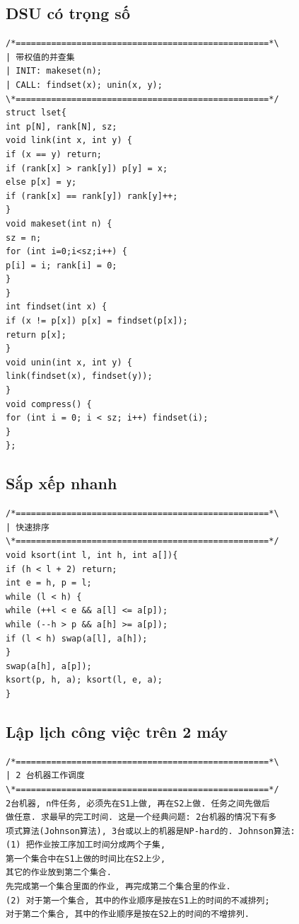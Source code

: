 \documentclass[11pt]{article}
\begin{document}
\subsection{DSU có trọng số}

\begingroup
\scriptsize
\begin{verbatim}
/*==================================================*\
| 带权值的并查集
| INIT: makeset(n);
| CALL: findset(x); unin(x, y);
\*==================================================*/
struct lset{
int p[N], rank[N], sz;
void link(int x, int y) {
if (x == y) return;
if (rank[x] > rank[y]) p[y] = x;
else p[x] = y;
if (rank[x] == rank[y]) rank[y]++;
}
void makeset(int n) {
sz = n;
for (int i=0;i<sz;i++) {
p[i] = i; rank[i] = 0;
}
}
int findset(int x) {
if (x != p[x]) p[x] = findset(p[x]);
return p[x];
}
void unin(int x, int y) {
link(findset(x), findset(y));
}
void compress() {
for (int i = 0; i < sz; i++) findset(i);
}
};
\end{verbatim}
\endgroup

\subsection{Sắp xếp nhanh}

\begingroup
\scriptsize
\begin{verbatim}
/*==================================================*\
| 快速排序
\*==================================================*/
void ksort(int l, int h, int a[]){
if (h < l + 2) return;
int e = h, p = l;
while (l < h) {
while (++l < e && a[l] <= a[p]);
while (--h > p && a[h] >= a[p]);
if (l < h) swap(a[l], a[h]);
}
swap(a[h], a[p]);
ksort(p, h, a); ksort(l, e, a);
}
\end{verbatim}
\endgroup

\subsection{Lập lịch công việc trên 2 máy}

\begingroup
\scriptsize
\begin{verbatim}
/*==================================================*\
| 2 台机器工作调度
\*==================================================*/
2台机器, n件任务, 必须先在S1上做, 再在S2上做. 任务之间先做后
做任意. 求最早的完工时间. 这是一个经典问题: 2台机器的情况下有多
项式算法(Johnson算法), 3台或以上的机器是NP-hard的. Johnson算法:
(1) 把作业按工序加工时间分成两个子集,
第一个集合中在S1上做的时间比在S2上少,
其它的作业放到第二个集合.
先完成第一个集合里面的作业, 再完成第二个集合里的作业.
(2) 对于第一个集合, 其中的作业顺序是按在S1上的时间的不减排列;
对于第二个集合, 其中的作业顺序是按在S2上的时间的不增排列.
\end{verbatim}
\endgroup
\end{document}
